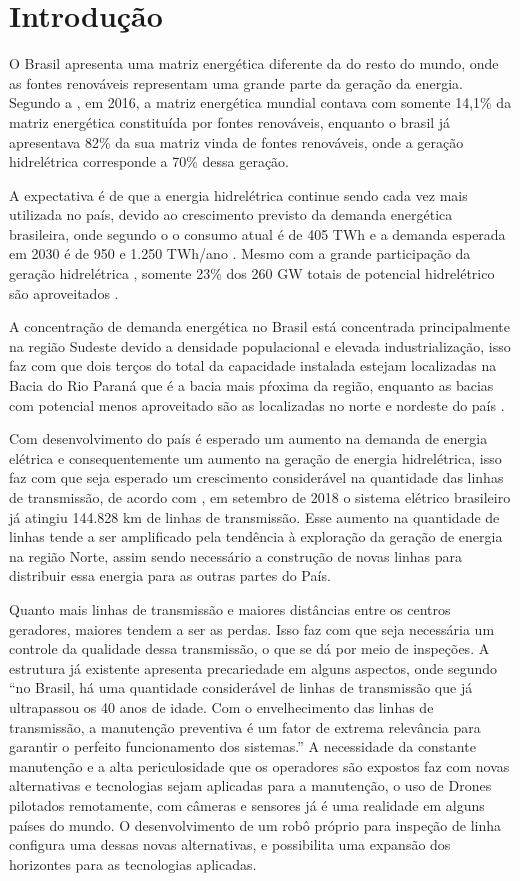 \chapter{Introdução}
\label{chap:intro}
O Brasil apresenta uma matriz energética diferente da do resto do mundo, onde as fontes renováveis representam uma grande parte da geração da energia. Segundo a \cite{epe_site}, em 2016, a matriz energética mundial contava com somente 14,1\% da matriz energética constituída por fontes renováveis, enquanto o brasil já apresentava 82\% da sua matriz vinda de fontes renováveis, onde a geração hidrelétrica corresponde a 70\% dessa geração.

A expectativa é de que a energia hidrelétrica continue sendo cada vez mais utilizada no país, devido ao crescimento previsto da demanda energética brasileira, onde segundo o \cite{atlas_aneel} o consumo atual é de 405 TWh e a demanda esperada em 2030 é de 950 e 1.250 TWh/ano \cite{bronzatti_matrizes}. Mesmo com a grande participação da geração hidrelétrica , somente 23\% dos 260 GW totais de potencial hidrelétrico são aproveitados \cite{atlas_aneel}.

A concentração de demanda energética no Brasil está concentrada principalmente na região Sudeste devido a densidade populacional e elevada industrialização, isso faz com que dois terços do total da  capacidade instalada estejam localizadas na Bacia do Rio Paraná  que é a bacia mais pŕoxima da região, enquanto as bacias com potencial menos aproveitado são as localizadas no norte e nordeste do país \cite{atlas_aneel}.

Com desenvolvimento do país é esperado um aumento na demanda de energia elétrica e consequentemente um aumento na geração de energia hidrelétrica, isso faz com que seja esperado um crescimento considerável na quantidade das linhas de transmissão, de acordo com \cite{MME}, em setembro de 2018 o sistema elétrico brasileiro já atingiu 144.828 km de linhas de transmissão.  Esse aumento na quantidade de linhas tende a ser amplificado pela tendência à exploração da geração de energia na região Norte, assim sendo necessário a construção de novas linhas para distribuir essa energia para as outras partes do País.

Quanto mais linhas de transmissão e maiores distâncias entre os centros geradores, maiores tendem a ser as perdas. Isso faz com que seja necessária um controle da qualidade dessa transmissão, o que se dá por meio de inspeções. A estrutura já existente apresenta precariedade em alguns aspectos, onde segundo \cite{rangel2009sistema} “no Brasil, há uma quantidade considerável de linhas de transmissão que já ultrapassou os 40 anos de idade. Com o envelhecimento das linhas de transmissão, a manutenção preventiva é um fator de extrema relevância para garantir o perfeito funcionamento dos sistemas.”
A necessidade da constante manutenção e a alta periculosidade que os operadores são expostos faz com novas alternativas e tecnologias sejam aplicadas para a manutenção, o uso de Drones pilotados remotamente, com câmeras e sensores já é uma realidade em alguns países do mundo. O desenvolvimento de um robô próprio para inspeção de linha configura uma dessas novas alternativas, e possibilita uma expansão dos horizontes para as tecnologias aplicadas.
